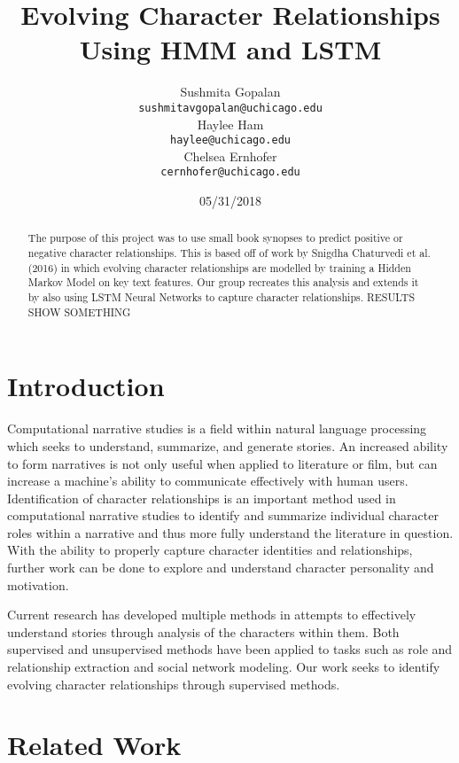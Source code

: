 \documentclass[11pt,a4paper]{article}
\title{Evolving Character Relationships Using HMM and LSTM}
\author{Sushmita Gopalan \\
  {\tt sushmitavgopalan@uchicago.edu} \\\And
  Haylee Ham \\
  {\tt haylee@uchicago.edu} \\\And
  Chelsea Ernhofer \\
  {\tt cernhofer@uchicago.edu} \\}
\date{05/31/2018}
\begin{document}
\maketitle
\makeauthor
\begin{abstract}
  The purpose of this project was to use small book synopses to predict positive or negative character relationships. This is based off of work by Snigdha Chaturvedi et al. (2016) in which evolving character relationships are modelled by training a Hidden Markov Model on key text features. Our group recreates this analysis and extends it by also using LSTM Neural Networks to capture character relationships. RESULTS SHOW SOMETHING  
\end{abstract}

\section{Introduction}

Computational narrative studies is a field within natural language processing which seeks to understand, summarize, and generate stories. An increased ability to form narratives is not only useful when applied to literature or film, but can increase a machine's ability to communicate effectively with human users. Identification of character relationships is an important method used in computational narrative studies to identify and summarize individual character roles within a narrative and thus more fully understand the literature in question. With the ability to properly capture character identities and relationships, further work can be done to explore and understand character personality and motivation.

Current research has developed multiple methods in attempts to effectively understand stories through analysis of the characters within them.  Both supervised and unsupervised methods have been applied to tasks such as role and relationship extraction and social network modeling. Our work seeks to identify evolving character relationships through supervised methods. 

\section{Related Work}
\end{document}
